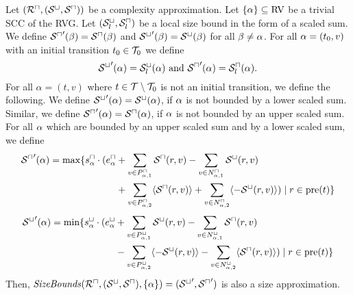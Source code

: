 \begin{theorem}
  Let $({\mathcal{R}^\sqcap}, {({\mathcal{S}^\sqcup}, {\mathcal{S}^\sqcap})})$ be a complexity approximation.
  Let $\lbrace \alpha \rbrace \subseteq \text{RV}$ be a trivial SCC of the RVG.
  Let ${({\mathcal{S}^\sqcup_l}, {\mathcal{S}^\sqcap_l})}$ be a local size bound in the form of a scaled sum.
  We define ${\mathcal{S}^\sqcap}'(\beta) = {\mathcal{S}^\sqcap}(\beta)$ and ${\mathcal{S}^\sqcup}'(\beta) = {\mathcal{S}^\sqcup}(\beta)$ for all $\beta \neq \alpha$.
  For all $\alpha = (t_0, v)$ with an initial transition $t_0 \in \mathcal{T}_0$ we define
  \[ {\mathcal{S}^\sqcup}'(\alpha) = {\mathcal{S}^\sqcup_l}(\alpha) \text{ and } {\mathcal{S}^\sqcap}'(\alpha) = {\mathcal{S}^\sqcap_l}(\alpha). \]
  For all $\alpha = (t, v)$ where $t \in \mathcal{T} \setminus \mathcal{T}_0$ is not an initial transition, we define the following.
  We define ${\mathcal{S}^\sqcup}'(\alpha) = {\mathcal{S}^\sqcup}(\alpha)$, if $\alpha$ is not bounded by a lower scaled sum.
  Similar, we define ${\mathcal{S}^\sqcap}'(\alpha) = {\mathcal{S}^\sqcap}(\alpha)$, if $\alpha$ is not bounded by an upper scaled sum.
  For all $\alpha$ which are bounded by an upper scaled sum and by a lower scaled sum, we define 
  \begin{equation}
    \begin{split}
      {\mathcal{S}^\sqcap}'(\alpha) = \max \lbrace  s^\sqcap_\alpha \cdot ( e^\sqcap_\alpha & + \sum_{v \in P_{\alpha,1}^\sqcap} {\mathcal{S}^\sqcap}(r, v) - \sum_{v \in N_{\alpha,1}^\sqcap} {\mathcal{S}^\sqcup}(r, v) \\
        & + \sum_{v \in P_{\alpha,2}^\sqcap} \langle{\mathcal{S}^\sqcap}(r, v)\rangle + \sum_{v \in N_{\alpha,2}^\sqcap} \langle-{\mathcal{S}^\sqcup}(r, v)\rangle ) \mid r \in \text{pre}(t) \rbrace
    \end{split}
  \end{equation}
  \begin{equation}
    \begin{split}
      {\mathcal{S}^\sqcup}'(\alpha) = \min \lbrace  s^\sqcup_\alpha \cdot ( e^\sqcup_\alpha & + \sum_{v \in P_{\alpha,1}^\sqcup} {\mathcal{S}^\sqcup}(r, v) - \sum_{v \in N_{\alpha,1}^\sqcup} {\mathcal{S}^\sqcap}(r, v) \\
        & - \sum_{v \in P_{\alpha,2}^\sqcup} \langle-{\mathcal{S}^\sqcup}(r, v)\rangle - \sum_{v \in N_{\alpha,2}^\sqcup} \langle{\mathcal{S}^\sqcap}(r, v)\rangle ) \mid r \in \text{pre}(t) \rbrace
    \end{split}
  \end{equation}
  Then, $\mathit{SizeBounds}({\mathcal{R}^\sqcap}, {({\mathcal{S}^\sqcup}, {\mathcal{S}^\sqcap})}, \lbrace \alpha \rbrace) = ({\mathcal{S}^\sqcup}', {\mathcal{S}^\sqcap}')$ is also a size approximation.
\end{theorem}
